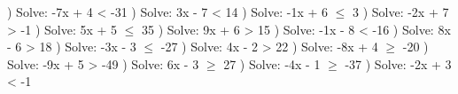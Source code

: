\documentclass{article}%
\begin{document}
\newline%
) Solve: -7x + 4 < -31%
\newline%
\newline%
) Solve: 3x - 7 < 14%
\newline%
\newline%
) Solve: -1x + 6 $\leq$ 3%
\newline%
\newline%
) Solve: -2x + 7 > -1%
\newline%
\newline%
) Solve: 5x + 5 $\leq$ 35%
\newline%
\newline%
) Solve: 9x + 6 > 15%
\newline%
\newline%
) Solve: -1x - 8 < -16%
\newline%
\newline%
) Solve: 8x - 6 > 18%
\newline%
\newline%
) Solve: -3x - 3 $\leq$ -27%
\newline%
\newline%
) Solve: 4x - 2 > 22%
\newline%
\newline%
) Solve: -8x + 4 $\geq$ -20%
\newline%
\newline%
) Solve: -9x + 5 > -49%
\newline%
\newline%
) Solve: 6x - 3 $\geq$ 27%
\newline%
\newline%
) Solve: -4x - 1 $\geq$ -37%
\newline%
\newline%
) Solve: -2x + 3 < -1%
\newline%
\end{document}
